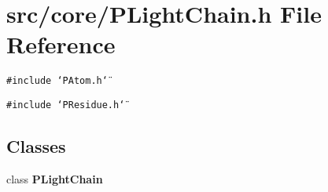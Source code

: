 \section{src/core/PLight\-Chain.h File Reference}
\label{PLightChain_8h}


{\tt \#include \char`\"{}PAtom.h\char`\"{}}\par
{\tt \#include \char`\"{}PResidue.h\char`\"{}}\par
\subsection*{Classes}
\begin{CompactItemize}
\item 
class {\bf PLight\-Chain}
\end{CompactItemize}
